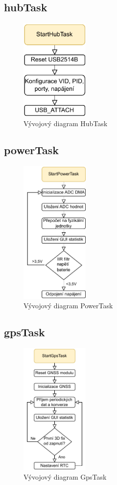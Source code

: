 \subsection{hubTask}
\begin{figure}[h]
    \centering
    \includegraphics[width=0.3\textwidth]{obrazky/HubTask}
    \caption{Vývojový diagram HubTask}
\end{figure}
\subsection{powerTask}
\begin{figure}[h]
    \centering
    \includegraphics[width=0.3\textwidth]{obrazky/PowerTask}
    \caption{Vývojový diagram PowerTask}
\end{figure}
\subsection{gpsTask}
\begin{figure}[h]
    \centering
    \includegraphics[width=0.3\textwidth]{obrazky/GpsTask}
    \caption{Vývojový diagram GpsTask}
\end{figure}
